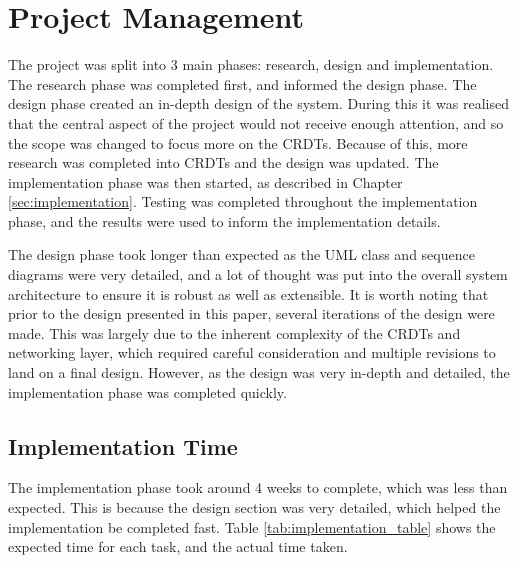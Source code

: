 \documentclass[12pt]{report}
\begin{document}
\chapter{Project Management}
The project was split into 3 main phases: research, design and implementation. The research phase was completed first, and informed the design phase. The design phase created an in-depth design of the system. During this it was realised that the central aspect of the project would not receive enough attention, and so the scope was changed to focus more on the CRDTs. Because of this, more research was completed into CRDTs and the design was updated. The implementation phase was then started, as described in Chapter \ref{sec:implementation}. Testing was completed throughout the implementation phase, and the results were used to inform the implementation details. \par

The design phase took longer than expected as the UML class and sequence diagrams were very detailed, and a lot of thought was put into the overall system architecture to ensure it is robust as well as extensible. It is worth noting that prior to the design presented in this paper, several iterations of the design were made. This was largely due to the inherent complexity of the CRDTs and networking layer, which required careful consideration and multiple revisions to land on a final design. However, as the design was very in-depth and detailed, the implementation phase was completed quickly. \par

\section{Implementation Time}
The implementation phase took around 4 weeks to complete, which was less than expected. This is because the design section was very detailed, which helped the implementation be completed fast. Table \ref{tab:implementation_table} shows the expected time for each task, and the actual time taken. \par
\end{document}
